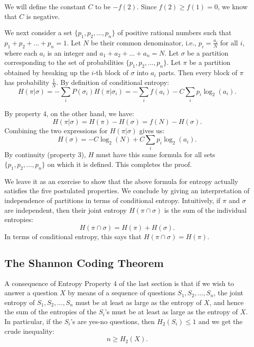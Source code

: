\documentclass{report}
\begin{document}
We will define the constant \( C \) to be \( -f(2) \). Since \( f(2) \geq f(1) = 0 \), we know that \( C \) is negative.

We next consider a set \( \{p_1, p_2, \ldots, p_n\} \) of positive rational numbers such that \( p_1 + p_2 + \ldots + p_n = 1 \). Let \( N \) be their common denominator, i.e., \( p_i = \frac{a_i}{N} \) for all \( i \), where each \( a_i \) is an integer and \( a_1 + a_2 + \ldots + a_n = N \). Let \( \sigma \) be a partition corresponding to the set of probabilities \( \{p_1, p_2, \ldots, p_n\} \). Let \( \pi \) be a partition obtained by breaking up the \( i \)-th block of \( \sigma \) into \( a_i \) parts. Then every block of \( \pi \) has probability \( \frac{1}{N} \). By definition of conditional entropy:
\[
H(\pi|\sigma) = -\sum_{i} P(\sigma_i) H(\pi|\sigma_i) = -\sum_{i} f(a_i) - C \sum_{i} p_i \log_2(a_i).
\]

By property 4, on the other hand, we have:
\[
H(\pi|\sigma) = H(\pi) - H(\sigma) = f(N) - H(\sigma).
\]
Combining the two expressions for \( H(\pi|\sigma) \) gives us:
\[
H(\sigma) = -C \log_2(N) + C \sum_{i} p_i \log_2(a_i).
\]
By continuity (property 3), \( H \) must have this same formula for all sets \( \{p_1, p_2, \ldots, p_n\} \) on which it is defined. This completes the proof.

We leave it as an exercise to show that the above formula for entropy actually satisfies the five postulated properties. We conclude by giving an interpretation of independence of partitions in terms of conditional entropy. Intuitively, if \( \pi \) and \( \sigma \) are independent, then their joint entropy \( H(\pi \cap \sigma) \) is the sum of the individual entropies:
\[
H(\pi \cap \sigma) = H(\pi) + H(\sigma).
\]
In terms of conditional entropy, this says that \( H(\pi \cap \sigma) = H(\pi) \).

\subsection*{The Shannon Coding Theorem}

A consequence of Entropy Property 4 of the last section is that if we wish to answer a question \( X \) by means of a sequence of questions \( S_1, S_2, \ldots, S_n \), the joint entropy of \( S_1, S_2, \ldots, S_n \) must be at least as large as the entropy of \( X \), and hence the sum of the entropies of the \( S_i \)'s must be at least as large as the entropy of \( X \). In particular, if the \( S_i \)'s are yes-no questions, then \( H_2(S_i) \leq 1 \) and we get the crude inequality:
\[
n \geq H_2(X).
\]
\end{document}
